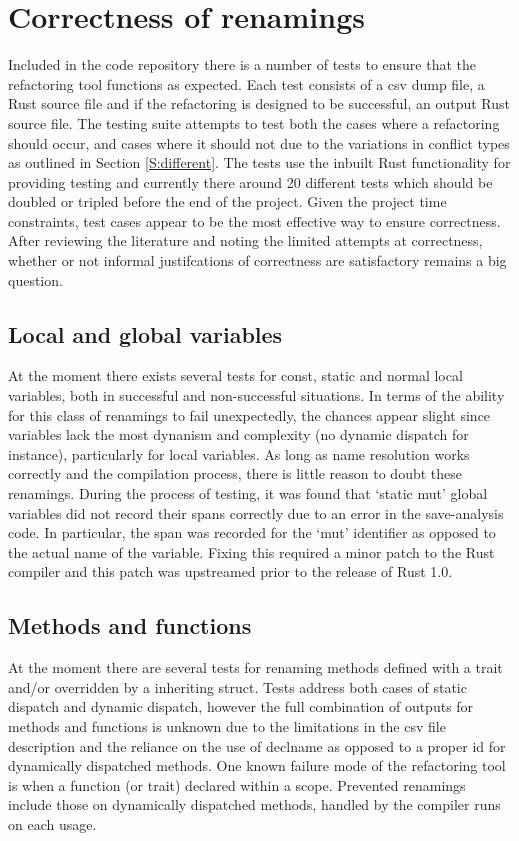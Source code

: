 \section{Correctness of renamings}
Included in the code repository there is a number of tests to ensure that the refactoring tool functions as expected. Each test consists of a csv dump file, a Rust source file and if the refactoring is designed to be successful, an output Rust source file. The testing suite attempts to test both the cases where a refactoring should occur, and cases where it should not due to the variations in conflict types as outlined in Section \ref{S:different}. The tests use the inbuilt Rust functionality for providing testing and currently there around 20 different tests which should be doubled or tripled before the end of the project. Given the project time constraints, test cases appear to be the most effective way to ensure correctness. After reviewing the literature and noting the limited attempts at correctness, whether or not informal justifcations of correctness are satisfactory remains a big question.

\subsection{Local and global variables}
At the moment there exists several tests for const, static and normal local variables, both in successful and non-successful situations. In terms of the ability for this class of renamings to fail unexpectedly, the chances appear slight since variables lack the most dynanism and complexity (no dynamic dispatch for instance), particularly for local variables. As long as name resolution works correctly and the compilation process, there is little reason to doubt these renamings. During the process of testing, it was found that `static mut' global variables did not record their spans correctly due to an error in the save-analysis code. In particular, the span was recorded for the `mut' identifier as opposed to the actual name of the variable. Fixing this required a minor patch to the Rust compiler and this patch was upstreamed prior to the release of Rust 1.0.


\subsection{Methods and functions}
At the moment there are several tests for renaming methods defined with a trait and/or overridden by a inheriting struct. Tests address both cases of static dispatch and dynamic dispatch, however the full combination of outputs for methods and functions is unknown due to the limitations in the csv file description and the reliance on the use of declname as opposed to a proper id for dynamically dispatched methods. One known failure mode of the refactoring tool is when a function (or trait) declared within a scope. Prevented renamings include those on dynamically dispatched methods, handled by the compiler runs on each usage.

